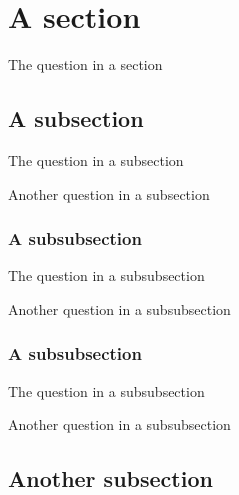 \documentclass{scrartcl}
\begin{document}
\section{A section}

\begin{question}\label{qu:test}
The question in a section
\end{question}

\thequestion

\subsection{A subsection}

\begin{question}
The question in a subsection
\end{question}

\begin{question}[label = lower-roman]\label{qu:test2}
Another question in a subsection
\end{question}

\thequestion

\subsubsection{A subsubsection}

\begin{question}\label{qu:test3}
The question in a subsubsection
\end{question}

\thequestion

\begin{question}
Another question in a subsubsection
\end{question}

\subsubsection{A subsubsection}

\begin{question}
The question in a subsubsection
\end{question}

\begin{question}
Another question in a subsubsection
\end{question}

\subsection{Another subsection}
\end{document}
